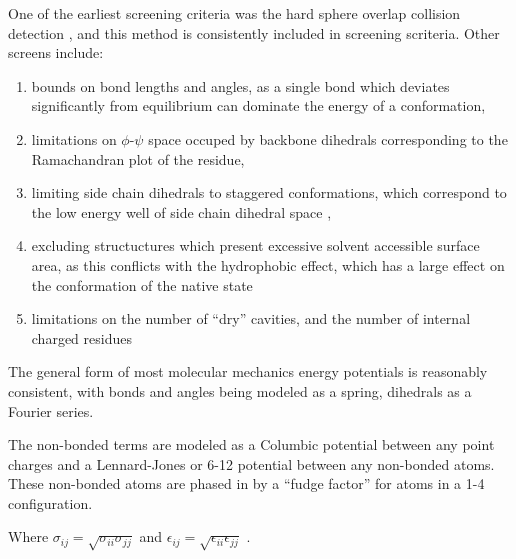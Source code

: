 One of the earliest screening criteria was the hard sphere overlap collision detection \cite{levinthal1966molecular}, and this method is consistently included in screening scriteria.
Other screens include:
\begin{enumerate}
\item bounds on bond lengths and angles, as a single bond which deviates significantly from equilibrium can dominate the energy of a conformation,
\item limitations on $\phi$-$\psi$ space occuped by backbone dihedrals corresponding to the Ramachandran plot of the residue,
\item limiting side chain dihedrals to staggered conformations, which correspond to the low energy well of side chain dihedral space \cite{moult1986algorithm},
\item excluding structuctures which present excessive solvent accessible surface area, as this conflicts with the hydrophobic effect, which has a large effect on the conformation of the native state \cite{chothia1975principles}
\item limitations on the number of ``dry'' cavities, and the number of internal charged residues \cite{moult1986algorithm}
\end{enumerate}

The general form of most molecular mechanics energy potentials is reasonably consistent, with bonds and angles being modeled as a spring, dihedrals as a Fourier series.




The non-bonded terms are modeled as a Columbic potential between any point charges and a Lennard-Jones or 6-12 potential between any non-bonded atoms.
These non-bonded atoms are phased in by a ``fudge factor'' for atoms in a 1-4 configuration.

Where $\sigma_{ij} = \sqrt{\sigma_{ii} \sigma_{jj}}$ and $\epsilon_{ij} = \sqrt{\epsilon_{ii}\epsilon_{jj}}$ \cite{jorgensen1996development}.







